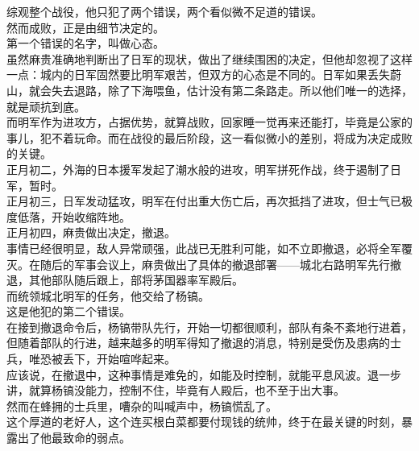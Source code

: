 \begin{multicols}{\theparacolNo}
综观整个战役，他只犯了两个错误，两个看似微不足道的错误。\\

然而成败，正是由细节决定的。\\

第一个错误的名字，叫做心态。\\

虽然麻贵准确地判断出了日军的现状，做出了继续围困的决定，但他却忽视了这样一点：城内的日军固然要比明军艰苦，但双方的心态是不同的。日军如果丢失蔚山，就会失去退路，除了下海喂鱼，估计没有第二条路走。所以他们唯一的选择，就是顽抗到底。\\

而明军作为进攻方，占据优势，就算战败，回家睡一觉再来还能打，毕竟是公家的事儿，犯不着玩命。而在战役的最后阶段，这一看似微小的差别，将成为决定成败的关键。\\

正月初二，外海的日本援军发起了潮水般的进攻，明军拼死作战，终于遏制了日军，暂时。\\

正月初三，日军发动猛攻，明军在付出重大伤亡后，再次抵挡了进攻，但士气已极度低落，开始收缩阵地。\\

正月初四，麻贵做出决定，撤退。\\

事情已经很明显，敌人异常顽强，此战已无胜利可能，如不立即撤退，必将全军覆灭。在随后的军事会议上，麻贵做出了具体的撤退部署——城北右路明军先行撤退，其他部队随后跟上，部将茅国器率军殿后。\\

而统领城北明军的任务，他交给了杨镐。\\

这是他犯的第二个错误。\\

在接到撤退命令后，杨镐带队先行，开始一切都很顺利，部队有条不紊地行进着，但随着部队的行进，越来越多的明军得知了撤退的消息，特别是受伤及患病的士兵，唯恐被丢下，开始喧哗起来。\\

应该说，在撤退中，这种事情是难免的，如能及时控制，就能平息风波。退一步讲，就算杨镐没能力，控制不住，毕竟有人殿后，也不至于出大事。\\

然而在蜂拥的士兵里，嘈杂的叫喊声中，杨镐慌乱了。\\

这个厚道的老好人，这个连买根白菜都要付现钱的统帅，终于在最关键的时刻，暴露出了他最致命的弱点。\\


\end{multicols}
